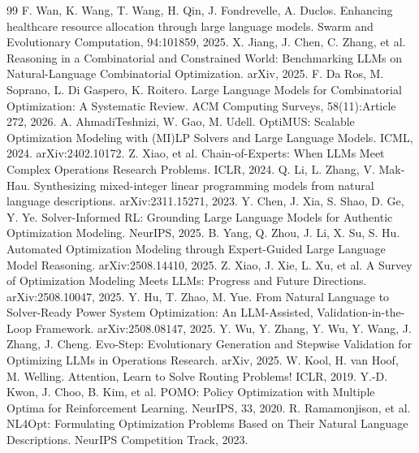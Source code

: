 \documentclass[11pt]{article}
\begin{document}
\begin{thebibliography}{99}
\small
{} F. Wan, K. Wang, T. Wang, H. Qin, J. Fondrevelle, A. Duclos. Enhancing healthcare resource allocation through large language models. Swarm and Evolutionary Computation, 94:101859, 2025.
 X. Jiang, J. Chen, C. Zhang, et al. Reasoning in a Combinatorial and Constrained World: Benchmarking LLMs on Natural-Language Combinatorial Optimization. arXiv, 2025.
 F. Da Ros, M. Soprano, L. Di Gaspero, K. Roitero. Large Language Models for Combinatorial Optimization: A Systematic Review. ACM Computing Surveys, 58(11):Article 272, 2026.
 A. AhmadiTeshnizi, W. Gao, M. Udell. OptiMUS: Scalable Optimization Modeling with (MI)LP Solvers and Large Language Models. ICML, 2024. arXiv:2402.10172.
 Z. Xiao, et al. Chain-of-Experts: When LLMs Meet Complex Operations Research Problems. ICLR, 2024.
 Q. Li, L. Zhang, V. Mak-Hau. Synthesizing mixed-integer linear programming models from natural language descriptions. arXiv:2311.15271, 2023.
 Y. Chen, J. Xia, S. Shao, D. Ge, Y. Ye. Solver-Informed RL: Grounding Large Language Models for Authentic Optimization Modeling. NeurIPS, 2025.
 B. Yang, Q. Zhou, J. Li, X. Su, S. Hu. Automated Optimization Modeling through Expert-Guided Large Language Model Reasoning. arXiv:2508.14410, 2025.
 Z. Xiao, J. Xie, L. Xu, et al. A Survey of Optimization Modeling Meets LLMs: Progress and Future Directions. arXiv:2508.10047, 2025.
 Y. Hu, T. Zhao, M. Yue. From Natural Language to Solver-Ready Power System Optimization: An LLM-Assisted, Validation-in-the-Loop Framework. arXiv:2508.08147, 2025.
 Y. Wu, Y. Zhang, Y. Wu, Y. Wang, J. Zhang, J. Cheng. Evo-Step: Evolutionary Generation and Stepwise Validation for Optimizing LLMs in Operations Research. arXiv, 2025.
 W. Kool, H. van Hoof, M. Welling. Attention, Learn to Solve Routing Problems! ICLR, 2019.
 Y.-D. Kwon, J. Choo, B. Kim, et al. POMO: Policy Optimization with Multiple Optima for Reinforcement Learning. NeurIPS, 33, 2020.
 R. Ramamonjison, et al. NL4Opt: Formulating Optimization Problems Based on Their Natural Language Descriptions. NeurIPS Competition Track, 2023.
\end{thebibliography}
\end{document}

